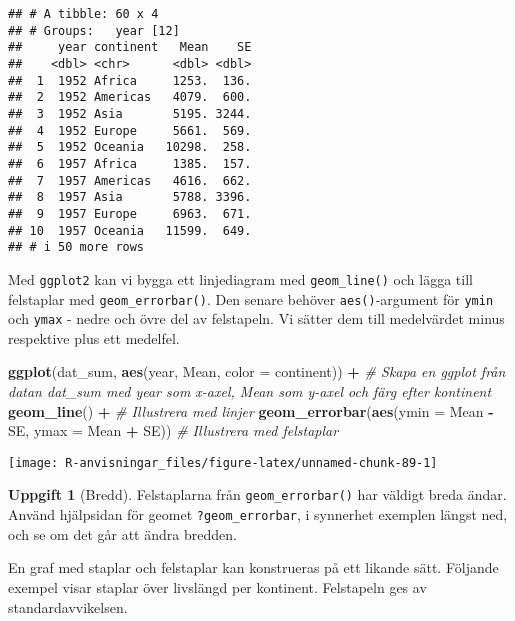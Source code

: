 \documentclass[
]{book}
\newenvironment{Shaded}{\begin{snugshade}}{\end{snugshade}}
\newcommand{\AttributeTok}[1]{\textcolor[rgb]{0.13,0.29,0.53}{#1}}
\newcommand{\CommentTok}[1]{\textcolor[rgb]{0.56,0.35,0.01}{\textit{#1}}}
\newcommand{\FunctionTok}[1]{\textcolor[rgb]{0.13,0.29,0.53}{\textbf{#1}}}
\newcommand{\NormalTok}[1]{#1}
\newcommand{\SpecialCharTok}[1]{\textcolor[rgb]{0.81,0.36,0.00}{\textbf{#1}}}
\theoremstyle{definition}
\theoremstyle{definition}
\theoremstyle{definition}
\newtheorem{exercise}{Uppgift}[chapter]
\theoremstyle{definition}
\theoremstyle{remark}
\begin{document}
\begin{verbatim}
## # A tibble: 60 x 4
## # Groups:   year [12]
##     year continent   Mean    SE
##    <dbl> <chr>      <dbl> <dbl>
##  1  1952 Africa     1253.  136.
##  2  1952 Americas   4079.  600.
##  3  1952 Asia       5195. 3244.
##  4  1952 Europe     5661.  569.
##  5  1952 Oceania   10298.  258.
##  6  1957 Africa     1385.  157.
##  7  1957 Americas   4616.  662.
##  8  1957 Asia       5788. 3396.
##  9  1957 Europe     6963.  671.
## 10  1957 Oceania   11599.  649.
## # i 50 more rows
\end{verbatim}

Med \texttt{ggplot2} kan vi bygga ett linjediagram med \texttt{geom\_line()} och lägga till felstaplar med \texttt{geom\_errorbar()}. Den senare behöver \texttt{aes()}-argument för \texttt{ymin} och \texttt{ymax} - nedre och övre del av felstapeln. Vi sätter dem till medelvärdet minus respektive plus ett medelfel.

\begin{Shaded}
\begin{Highlighting}[]
\FunctionTok{ggplot}\NormalTok{(dat\_sum, }\FunctionTok{aes}\NormalTok{(year, Mean, }\AttributeTok{color =}\NormalTok{ continent)) }\SpecialCharTok{+}      \CommentTok{\# Skapa en ggplot från datan dat\_sum med year som x{-}axel, Mean som y{-}axel och färg efter kontinent}
  \FunctionTok{geom\_line}\NormalTok{() }\SpecialCharTok{+}                                            \CommentTok{\# Illustrera med linjer}
  \FunctionTok{geom\_errorbar}\NormalTok{(}\FunctionTok{aes}\NormalTok{(}\AttributeTok{ymin =}\NormalTok{ Mean }\SpecialCharTok{{-}}\NormalTok{ SE, }\AttributeTok{ymax =}\NormalTok{ Mean }\SpecialCharTok{+}\NormalTok{ SE))   }\CommentTok{\# Illustrera med felstaplar}
\end{Highlighting}
\end{Shaded}

\begin{center}\texttt{[image: R-anvisningar\_files/figure-latex/unnamed-chunk-89-1]} \end{center}

\begin{exercise}[Bredd]
Felstaplarna från \texttt{geom\_errorbar()} har väldigt breda ändar. Använd hjälpsidan för geomet \texttt{?geom\_errorbar}, i synnerhet exemplen längst ned, och se om det går att ändra bredden.
\end{exercise}

En graf med staplar och felstaplar kan konstrueras på ett likande sätt. Följande exempel visar staplar över livslängd per kontinent. Felstapeln ges av standardavvikelsen.
\end{document}
